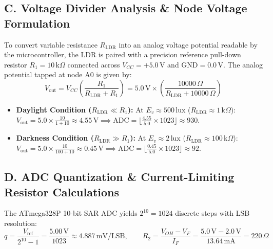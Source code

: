 \documentclass[10pt,a4paper]{article}
\begin{document}
\newpage

\subsection*{C. Voltage Divider Analysis \& Node Voltage Formulation}
To convert variable resistance $R_{\text{LDR}}$ into an analog voltage potential readable by the microcontroller, the LDR is paired with a precision reference pull-down resistor $R_1 = 10\,\text{k}\Omega$ connected across $V_{CC} = +5.0\,\text{V}$ and $\text{GND} = 0.0\,\text{V}$. The analog potential tapped at node A0 is given by:
\begin{equation}
V_{\text{out}} = V_{CC} \left( \frac{R_1}{R_{\text{LDR}} + R_1} \right) = 5.0\,\text{V} \times \left( \frac{10000\,\Omega}{R_{\text{LDR}} + 10000\,\Omega} \right)
\end{equation}
\begin{itemize}[noitemsep]
    \item \textbf{Daylight Condition ($R_{\text{LDR}} \ll R_1$):} At $E_v \approx 500\,\text{lux}$ ($R_{\text{LDR}} \approx 1\,\text{k}\Omega$): $V_{\text{out}} = 5.0 \times \frac{10}{1+10} \approx 4.55\,\text{V} \implies \text{ADC} = \lfloor \frac{4.55}{5.0} \times 1023 \rfloor \approx 930$.
    \item \textbf{Darkness Condition ($R_{\text{LDR}} \gg R_1$):} At $E_v \approx 2\,\text{lux}$ ($R_{\text{LDR}} \approx 100\,\text{k}\Omega$): $V_{\text{out}} = 5.0 \times \frac{10}{100+10} \approx 0.45\,\text{V} \implies \text{ADC} = \lfloor \frac{0.45}{5.0} \times 1023 \rfloor \approx 92$.
\end{itemize}

\subsection*{D. ADC Quantization \& Current-Limiting Resistor Calculations}
The ATmega328P 10-bit SAR ADC yields $2^{10} = 1024$ discrete steps with LSB resolution:
\begin{equation}
q = \frac{V_{\text{ref}}}{2^{10}-1} = \frac{5.00\,\text{V}}{1023} \approx 4.887\,\text{mV/LSB}, \qquad R_2 = \frac{V_{OH} - V_F}{I_F} = \frac{5.0\,\text{V} - 2.0\,\text{V}}{13.64\,\text{mA}} = 220\,\Omega
\end{equation}
\end{document}
